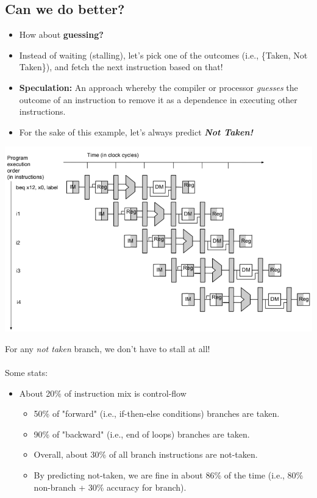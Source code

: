 \documentclass[10pt]{article}
\begin{document}
\subsection*{Can we do better?}
\begin{itemize}
    \item How about \textbf{guessing?}
    \item Instead of waiting (stalling), let's pick one of the outcomes (i.e., \{Taken, Not Taken\}), and fetch the next instruction based on that!
    \item \textbf{Speculation:} An approach whereby the compiler or processor \textit{guesses} the outcome of an instruction to remove it as a dependence in executing other instructions.
    \item For the sake of this example, let's always predict \textbf{\textit{Not Taken!}}
\end{itemize}
\begin{center}
    \includegraphics*[scale=0.6]{W3_17.png}
\end{center}
For any \textit{not taken} branch, we don't have to stall at all!\\\\
Some stats:
\begin{itemize}
    \item About 20\% of instruction mix is control-flow
    \begin{itemize}
        \item 50\% of "forward" (i.e., if-then-else conditions) branches are taken.
        \item 90\% of "backward" (i.e., end of loops) branches are taken.
        \item Overall, about 30\% of all branch instructions are not-taken.
        \item By predicting not-taken, we are fine in about 86\% of the time (i.e., 80\% non-branch + 30\% accuracy for branch).
    \end{itemize}
\end{itemize}
\end{document}
